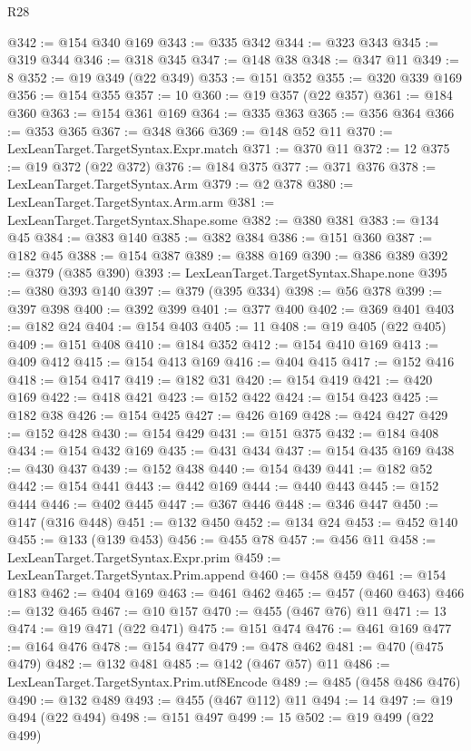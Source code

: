 \begin{lexlean}{R28}
\begin{coremodule}
@342 := @154 @340 @169
@343 := @335 @342
@344 := @323 @343
@345 := @319 @344
@346 := @318 @345
@347 := @148 @38
@348 := @347 @11
@349 := 8
@352 := @19 @349 (@22 @349)
@353 := @151 @352
@355 := @320 @339 @169
@356 := @154 @355
@357 := 10
@360 := @19 @357 (@22 @357)
@361 := @184 @360
@363 := @154 @361 @169
@364 := @335 @363
@365 := @356 @364
@366 := @353 @365
@367 := @348 @366
@369 := @148 @52 @11
@370 := LexLeanTarget.TargetSyntax.Expr.match
@371 := @370 @11
@372 := 12
@375 := @19 @372 (@22 @372)
@376 := @184 @375
@377 := @371 @376
@378 := LexLeanTarget.TargetSyntax.Arm
@379 := @2 @378
@380 := LexLeanTarget.TargetSyntax.Arm.arm
@381 := LexLeanTarget.TargetSyntax.Shape.some
@382 := @380 @381
@383 := @134 @45
@384 := @383 @140
@385 := @382 @384
@386 := @151 @360
@387 := @182 @45
@388 := @154 @387
@389 := @388 @169
@390 := @386 @389
@392 := @379 (@385 @390)
@393 := LexLeanTarget.TargetSyntax.Shape.none
@395 := @380 @393 @140
@397 := @379 (@395 @334)
@398 := @56 @378
@399 := @397 @398
@400 := @392 @399
@401 := @377 @400
@402 := @369 @401
@403 := @182 @24
@404 := @154 @403
@405 := 11
@408 := @19 @405 (@22 @405)
@409 := @151 @408
@410 := @184 @352
@412 := @154 @410 @169
@413 := @409 @412
@415 := @154 @413 @169
@416 := @404 @415
@417 := @152 @416
@418 := @154 @417
@419 := @182 @31
@420 := @154 @419
@421 := @420 @169
@422 := @418 @421
@423 := @152 @422
@424 := @154 @423
@425 := @182 @38
@426 := @154 @425
@427 := @426 @169
@428 := @424 @427
@429 := @152 @428
@430 := @154 @429
@431 := @151 @375
@432 := @184 @408
@434 := @154 @432 @169
@435 := @431 @434
@437 := @154 @435 @169
@438 := @430 @437
@439 := @152 @438
@440 := @154 @439
@441 := @182 @52
@442 := @154 @441
@443 := @442 @169
@444 := @440 @443
@445 := @152 @444
@446 := @402 @445
@447 := @367 @446
@448 := @346 @447
@450 := @147 (@316 @448)
@451 := @132 @450
@452 := @134 @24
@453 := @452 @140
@455 := @133 (@139 @453)
@456 := @455 @78
@457 := @456 @11
@458 := LexLeanTarget.TargetSyntax.Expr.prim
@459 := LexLeanTarget.TargetSyntax.Prim.append
@460 := @458 @459
@461 := @154 @183
@462 := @404 @169
@463 := @461 @462
@465 := @457 (@460 @463)
@466 := @132 @465
@467 := @10 @157
@470 := @455 (@467 @76) @11
@471 := 13
@474 := @19 @471 (@22 @471)
@475 := @151 @474
@476 := @461 @169
@477 := @164 @476
@478 := @154 @477
@479 := @478 @462
@481 := @470 (@475 @479)
@482 := @132 @481
@485 := @142 (@467 @57) @11
@486 := LexLeanTarget.TargetSyntax.Prim.utf8Encode
@489 := @485 (@458 @486 @476)
@490 := @132 @489
@493 := @455 (@467 @112) @11
@494 := 14
@497 := @19 @494 (@22 @494)
@498 := @151 @497
@499 := 15
@502 := @19 @499 (@22 @499)

\end{coremodule}
\end{lexlean}
